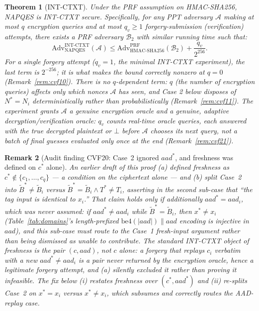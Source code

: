 \documentclass[11pt,a4paper]{article}
\newtheorem{theorem}{Theorem}[section]
\newtheorem{remark}[theorem]{Remark}
\begin{document}
\begin{theorem}[INT-CTXT]\label{thm:int-ctxt}
  Under the PRF assumption on HMAC-SHA256, NAPQES is INT-CTXT secure.
  Specifically, for any PPT adversary $\mathcal{A}$ making at most $q$
  encryption queries and at most $q_v \geq 1$ forgery-submission
  (verification) attempts, there exists a PRF adversary $\mathcal{B}_2$
  with similar running time such that:
  \[
    \mathrm{Adv}^{\mathrm{INT\text{-}CTXT}}_{\mathrm{NAPQES}}(\mathcal{A})
    \leq
    \mathrm{Adv}^{\mathrm{PRF}}_{\mathrm{HMAC\text{-}SHA256}}(\mathcal{B}_2)
    + \frac{q_v}{2^{256}}.
  \]
  For a single forgery attempt ($q_v = 1$, the minimal INT-CTXT
  experiment), the last term is $2^{-256}$; it is what makes the bound
  correctly nonzero at $q=0$ (Remark~\ref{rem:cvf10}). There is no
  $q$-dependent term: $q$ (the number of encryption queries) affects only
  which nonces $\mathcal{A}$ has seen, and Case 2 below disposes of
  $N^*=N_i$ deterministically rather than probabilistically
  (Remark~\ref{rem:cvf11}). The experiment grants $\mathcal{A}$ a genuine
  encryption oracle and a genuine, \emph{adaptive} decryption/verification
  oracle: $q_v$ counts real-time oracle queries, each answered with the
  true decrypted plaintext or $\bot$ before $\mathcal{A}$ chooses its next
  query, not a batch of final guesses evaluated only once at the end
  (Remark~\ref{rem:cvf21}).
\end{theorem}

\begin{remark}[Audit finding CVF20: Case~2 ignored $aad^*$, and freshness was defined on $c^*$ alone]
\label{rem:cvf20}
An earlier draft of this proof (a) defined freshness as $c^* \notin
\{c_1,\ldots,c_q\}$ --- a condition on the ciphertext alone --- and (b)
split Case~2 into $\widetilde{B}^* \neq \widetilde{B}_i$ versus
$\widetilde{B}^* = \widetilde{B}_i \wedge T^* \neq T_i$, asserting in the
second sub-case that ``the tag input is identical to $x_i$.'' That claim
holds only if additionally $aad^* = aad_i$, which was never assumed: if
$aad^* \neq aad_i$ while $\widetilde{B}^* = \widetilde{B}_i$, then
$x^* \neq x_i$ (Table~\ref{tab:domains}'s length-prefixed
$\mathrm{be4}(|aad|)\|aad$ encoding is injective in $aad$), and this
sub-case must route to the Case~1 fresh-input argument rather than being
dismissed as unable to contribute. The standard INT-CTXT object of
freshness is the pair $(c,aad)$, not $c$ alone: a forgery that replays
$c_i$ verbatim with a new $aad^* \neq aad_i$ is a pair never returned by
the encryption oracle, hence a legitimate forgery attempt, and (a) silently
excluded it rather than proving it infeasible. The fix below (i) restates
freshness over $(c^*,aad^*)$ and (ii) re-splits Case~2 on $x^*=x_i$ versus
$x^*\neq x_i$, which subsumes and correctly routes the AAD-replay case.
\end{remark}
\end{document}
